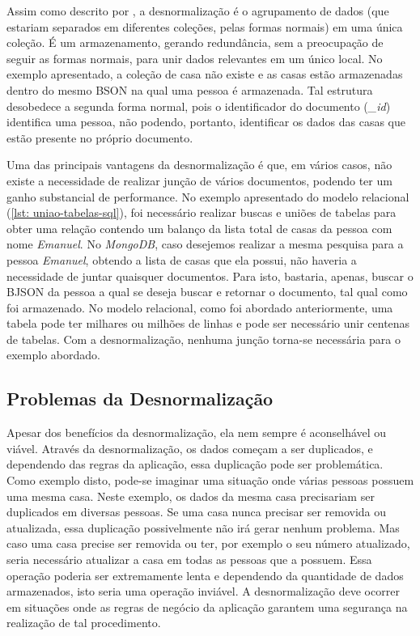 Assim como descrito por , a desnormalização é o agrupamento de dados (que estariam separados em diferentes coleções, pelas formas normais) em uma única coleção. É um armazenamento, gerando redundância, sem a preocupação de seguir as formas normais, para unir dados relevantes em um único local. No exemplo apresentado, a coleção de casa não existe e as casas estão armazenadas dentro do mesmo BSON na qual uma pessoa é armazenada. Tal estrutura desobedece a segunda forma normal, pois o identificador do documento (\textit{\_id}) identifica uma pessoa, não podendo, portanto, identificar os dados das casas que estão presente no próprio documento.
    
Uma das principais vantagens da desnormalização é que, em vários casos, não existe a necessidade de realizar junção de vários documentos, podendo ter um ganho substancial de performance. No exemplo apresentado do modelo relacional (\ref{lst: uniao-tabelas-sql}), foi necessário realizar buscas e uniões de tabelas para obter uma relação contendo um balanço da lista total de casas da pessoa com nome \textit{Emanuel}. No \textit{MongoDB}, caso desejemos realizar a mesma pesquisa para a pessoa \textit{Emanuel}, obtendo a lista de casas que ela possui, não haveria a necessidade de juntar quaisquer documentos. Para isto, bastaria, apenas, buscar o BJSON da pessoa a qual se deseja buscar e retornar o documento, tal qual como foi armazenado. No modelo relacional, como foi abordado anteriormente, uma tabela pode ter milhares ou milhões de linhas e pode ser necessário unir centenas de tabelas. Com a desnormalização, nenhuma junção torna-se necessária para o exemplo abordado.

\subsection{Problemas da Desnormalização}
    
Apesar dos benefícios da desnormalização, ela nem sempre é aconselhável ou viável. Através da desnormalização, os dados começam a ser duplicados, e dependendo das regras da aplicação, essa duplicação pode ser problemática. Como exemplo disto, pode-se imaginar uma situação onde várias pessoas possuem uma mesma casa. Neste exemplo, os dados da mesma casa precisariam ser duplicados em diversas pessoas. Se uma casa nunca precisar ser removida ou atualizada, essa duplicação possivelmente não irá gerar nenhum problema. Mas caso uma casa precise ser removida ou ter, por exemplo o seu número atualizado, seria necessário atualizar a casa em todas as pessoas que a possuem. Essa operação poderia ser extremamente lenta e dependendo da quantidade de dados armazenados, isto seria uma operação inviável. A desnormalização deve ocorrer em situações onde as regras de negócio da aplicação garantem uma segurança na realização de tal procedimento.
    
